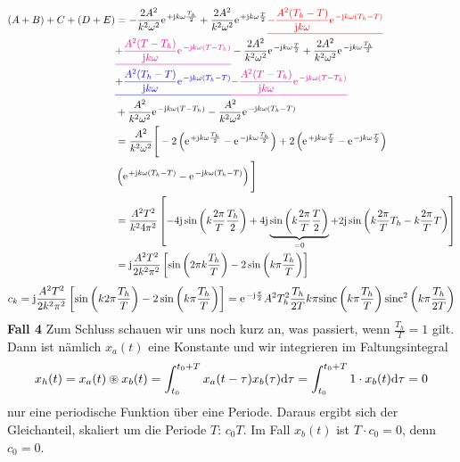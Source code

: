 \documentclass[11pt,a4paper,DIV=12]{scrartcl}
\newcommand{\sinc}{\mathrm{sinc}}
\begin{document}
%
%
%
\begin{align}
	(A+B)+C+(D+E)&=-\frac{2A^2}{k^2\omega^2}\e^{+\im k \omega \frac{T_h}{2}}+\frac{2A^2}{k^2\omega^2}\e^{+\im k \omega \frac{T}{2}}\ured{-\frac{A^2(T_h-T)}{\im k \omega}\e^{-\im k \omega (T_h-T)}}\nonumber \\
	&\umagenta{+\frac{A^2(T-T_h)}{\im k \omega}\e^{-\im k \omega(T-T_h)}}-\frac{2A^2}{k^2\omega^2}\e^{-\im k \omega \frac{T}{2}}+\frac{2A^2}{k^2\omega^2}\e^{-\im k \omega \frac{T_h}{2}}\nonumber\\
	&\ublue{+\frac{A^2(T_h-T)}{\im k \omega}\e^{-\im k \omega (T_h-T)}}\umagenta{-\frac{A^2(T-T_h)}{\im k \omega}\e^{-\im k \omega (T-T_h)}}\nonumber \\
	&+\frac{A^2}{k^2\omega^2}\e^{-\im k \omega (T-T_h)}-\frac{A^2}{k^2\omega^2}\e^{-\im k \omega (T_h-T)}\nonumber \\
	&=\frac{A^2}{k^2\omega^2}\Bigg [-2\left (\e^{+\im k \omega \frac{T_h}{2}}-\e^{-\im k \omega \frac{T_h}{2}}\right )+2\left (\e^{+\im k \omega \frac{T}{2}}-\e^{-\im k \omega \frac{T}{2}}\right )\nonumber \\
	&\left (\e^{+\im k \omega (T_h-T)}-\e^{-\im k \omega (T_h-T)}\right )\Bigg ]\nonumber \\
	&=\frac{A^2T^2}{k^24\pi^2}\left [-4\im \sin\left(k\frac{2\pi}{T}\frac{T_h}{2}\right)+4\im\underbrace{\sin\left(k\frac{2\pi}{T}\frac{T}{2}\right)}_{=0}+2\im\sin\left(k\frac{2\pi}{T}T_h-k\frac{2\pi}{T}T\right)\right ]\nonumber \\
	&=\im\frac{A^2T^2}{2k^2\pi^2}\left [\sin\left(2\pi k\frac{T_h}{T}\right)-2\sin\left(k\pi \frac{T_h}{T}\right)\right ]
\end{align}
%
%
%
\begin{align}
	c_k=\im\frac{A^2T^2}{2k^2\pi^2}\left [\sin\left(k2\pi\frac{T_h}{T}\right)-2\sin\left(k\pi\frac{T_h}{T}\right)\right ]
	=\e^{-\im\frac{\pi}{2}}A^2T_h^2\frac{T_h}{2T}k\pi\sinc\left(k\pi\frac{T_h}{T}\right)\sinc^2\left(k\pi\frac{T_h}{2T}\right)
\end{align}
%
\textbf{Fall 4}
%
Zum Schluss schauen wir uns noch kurz an, was passiert, wenn $\frac{T_h}{T}=1$
gilt.
%
Dann ist nämlich $x_{a}(t)$ eine Konstante und wir integrieren im
Faltungsintegral
%
\begin{align}
	x_{h}(t)=x_{a}(t)\circledast x_{b}(t)
	=\int_{t_0}^{t_0+T}x_{a}(t-\tau)x_{b}(\tau)\mathrm{d} \tau
	=\int_{t_0}^{t_0+T}1\cdot x_{b}(t)\mathrm{d} \tau = 0
\end{align}
%
nur eine periodische Funktion über eine Periode.
%
Daraus ergibt sich der Gleichanteil, skaliert um die Periode $T$: $c_0T$. Im Fall $x_b(t)$ ist $T\cdot c_0=0$, denn $c_0=0$.\
\end{document}
